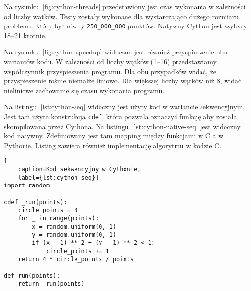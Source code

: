 \begin{figure*}
    \centering
    \begin{minipage}[b]{.45\textwidth}
        \centering
        
        \caption{Czas wykonania algorytmu w Cythonie w zależności od liczby wątków}
        \label{fig:cython-threads}
    \end{minipage}
    \hfill
    \begin{minipage}[b]{.45\textwidth}
        \centering
        
        \caption{Przyspieszenie liczenia liczby $\pi$ w Cythonie}
        \label{fig:cython-speedup}
    \end{minipage}
\end{figure*}

Na rysunku~\ref{fig:cython-threads} przedstawiony jest czas wykonania
w zależności od liczby wątków.
Testy zostały wykonane dla wystarczająco dużego rozmiaru problemu,
który był równy \texttt{250\_000\_000} punktów.
Natywny Cython jest szybszy 18--21 krotnie.

Na rysunku~\ref{fig:cython-speedup} widoczne jest również przyspieszenie
obu wariantów kodu.
W zależności od liczby wątków (1--16) przedstawiamy współczynnik
przyspieszenia programu.
Dla obu przypadków widać, że przyspieszenie rośnie niemalże liniowo.
Dla większej liczby wątków niż 8, widać nieliniowe zachowanie się czasu
wykonania programu.

Na listingu~\ref{lst:cython-seq} widoczny jest użyty kod w wariancie
sekwencyjnym.
Jest tam użyta konstrukcja \texttt{cdef}, która pozwala
oznaczyć funkcję aby została skompilowana przez Cythona.
Na listingu~\ref{lst:cython-native-seq} jest widoczny kod
natywny.
Zdefiniowany jest tam mapping między funkcjami w C a w Pythonie.
Listing zawiera również implementację algorytmu w kodzie C\@.

\begin{lstlisting}[
    caption=Kod sekwencyjny w Cythonie,
    label={lst:cython-seq}]
import random

cdef _run(points):
    circle_points = 0
    for _ in range(points):
        x = random.uniform(0, 1)
        y = random.uniform(0, 1)
        if (x - 1) ** 2 + (y - 1) ** 2 < 1:
            circle_points += 1
    return 4 * circle_points / points

def run(points):
    return _run(points)

\end{lstlisting}

